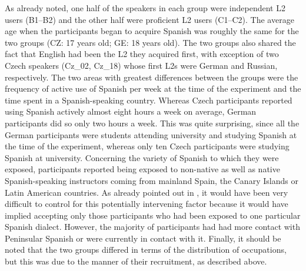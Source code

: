 As already noted, one half of the speakers in each group were independent L2 users (B1--B2) and the other half were proficient L2 users (C1--C2). The average age when the participants began to acquire Spanish was roughly the same for the two groups (CZ: 17 years old; GE: 18 years old). The two groups also shared the fact that English had been the L2 they acquired first, with exception of two Czech speakers (Cz\_02, Cz\_18) whose first L2s were German and Russian, respectively. The two areas with greatest differences between the groups were the frequency of active use of Spanish per week at the time of the experiment and the time spent in a Spanish-speaking country. Whereas Czech participants reported using Spanish actively almost eight hours a week on average, German participants did so only two hours a week. This was quite surprising, since all the German participants were students attending university and studying Spanish at the time of the experiment, whereas only ten Czech participants were studying Spanish at university. Concerning the variety of Spanish to which they were exposed, participants reported being exposed to non-native as well as native Spanish-speaking instructors coming from mainland Spain, the Canary Islands or Latin American countries. As already pointed out in , it would have been very difficult to control for this potentially intervening factor because it would have implied accepting only those participants who had been exposed to one particular Spanish dialect. However, the majority of participants had had more contact with Peninsular Spanish or were currently in contact with it. Finally, it should be noted that the two groups differed in terms of the distribution of occupations, but this was due to the manner of their recruitment, as described above.\pagebreak



